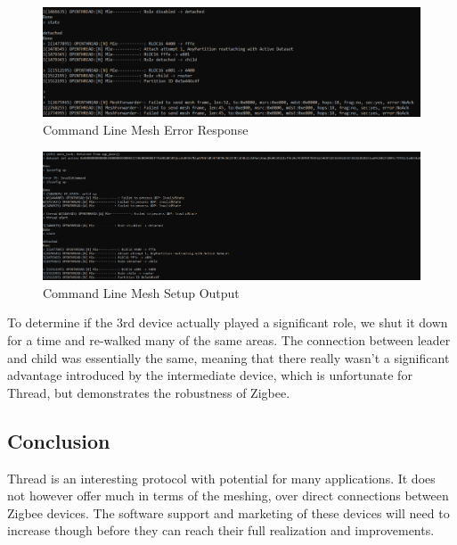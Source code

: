 \documentclass[letterpaper,twocolumn,10pt]{article}
\begin{document}
\begin{figure}
    \centering
    \includegraphics[width=0.75\linewidth]{Figures/Mesh_Error_Response.png}
    \caption{Command Line Mesh Error Response}
    \label{fig:mesh_error}
\end{figure}

\begin{figure}
    \centering
    \includegraphics[width=0.75\linewidth]{Figures/Mesh_Initial_Setup.png}
    \caption{Command Line Mesh Setup Output}
    \label{fig:mesh_setup}
\end{figure}

To determine if the 3rd device actually played a significant role, we shut it down for a time and re-walked many of the same areas. The connection between leader and child was essentially the same, meaning that there really wasn't a significant advantage introduced by the intermediate device, which is unfortunate for Thread, but demonstrates the robustness of Zigbee.

\subsection*{Conclusion}

Thread is an interesting protocol with potential for many applications. It does not however offer much in terms of the meshing, over direct connections between Zigbee devices. The software support and marketing of these devices will need to increase though before they can reach their full realization and improvements.


\printbibliography
\end{document}

